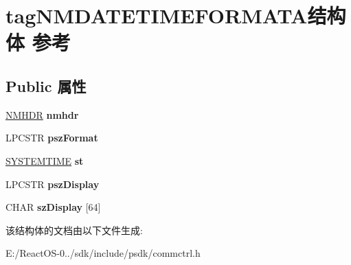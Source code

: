 \hypertarget{structtag_n_m_d_a_t_e_t_i_m_e_f_o_r_m_a_t_a}{}\section{tag\+N\+M\+D\+A\+T\+E\+T\+I\+M\+E\+F\+O\+R\+M\+A\+T\+A结构体 参考}
\label{structtag_n_m_d_a_t_e_t_i_m_e_f_o_r_m_a_t_a}
\subsection*{Public 属性}
\begin{DoxyCompactItemize}
\item 
\mbox{\label{structtag_n_m_d_a_t_e_t_i_m_e_f_o_r_m_a_t_a_ac912590f1491164e1ce090b78f435b91}} 
\hyperlink{structtag_n_m_h_d_r}{N\+M\+H\+DR} {\bfseries nmhdr}
\item 
\mbox{\label{structtag_n_m_d_a_t_e_t_i_m_e_f_o_r_m_a_t_a_a6093f92f0b8085140cf5d0ac7dd93b60}} 
L\+P\+C\+S\+TR {\bfseries psz\+Format}
\item 
\mbox{\label{structtag_n_m_d_a_t_e_t_i_m_e_f_o_r_m_a_t_a_ad21cce6cec72b54420c6fe1dd4e239e3}} 
\hyperlink{struct___s_y_s_t_e_m_t_i_m_e}{S\+Y\+S\+T\+E\+M\+T\+I\+ME} {\bfseries st}
\item 
\mbox{\label{structtag_n_m_d_a_t_e_t_i_m_e_f_o_r_m_a_t_a_a8d23563ddc679f0f7731952d5c4ec302}} 
L\+P\+C\+S\+TR {\bfseries psz\+Display}
\item 
\mbox{\label{structtag_n_m_d_a_t_e_t_i_m_e_f_o_r_m_a_t_a_ae9914cbfb4b2fdbf4ae7e9f41cd5685b}} 
C\+H\+AR {\bfseries sz\+Display} \mbox{[}64\mbox{]}
\end{DoxyCompactItemize}


该结构体的文档由以下文件生成\+:\begin{DoxyCompactItemize}
\item 
E\+:/\+React\+O\+S-\/0../sdk/include/psdk/commctrl.\+h\end{DoxyCompactItemize}
